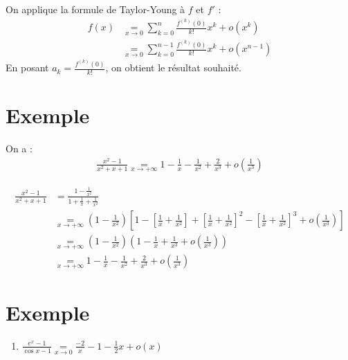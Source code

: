 \documentclass[../main.tex]{subfiles}
\begin{document}
\noindent On applique la formule de Taylor-Young à $f$ et $f'$ : 
\begin{align*}
    f(x) &\underset{x\to 0}{=} \sum_{k=0}^{n} \frac{f^{(k)}(0)}{k!} x^k + o(x^k) \\
    &\underset{x\to 0}{=} \sum_{k=0}^{n-1} \frac{f^{(k)}(0)}{k!} x^k + o(x^{n-1})
\end{align*}
En posant $a_k = \frac{f^{(k)}(0)}{k!}$, on obtient le résultat souhaité. 

\section{Exemple}
\begin{tcolorbox}[title=Exemple 25.75, title filled=false, colframe=darkgreen, colback=darkgreen!10!white]
    On a : 
    \begin{align*}
        \frac{x^2 - 1}{x^2 + x + 1} \underset{x\to +\infty}{=} 1 - \frac{1}{x} - \frac{1}{x^2} + \frac{2}{x^3} + o\left( \frac{1}{x^3} \right)
    \end{align*}
\end{tcolorbox}

\begin{align*}
    \frac{x^2 - 1}{x^2 + x + 1} &= \frac{1 - \frac{1}{x^2}}{1 + \frac{1}{x} + \frac{1}{x^2}} \\
    &\underset{x\to +\infty}{=} \left( 1 - \frac{1}{x^2} \right) \left[ 1 - \left[ \frac{1}{x} + \frac{1}{x^2} \right] + \left[ \frac{1}{x} + \frac{1}{x^2} \right]^2 - \left[ \frac{1}{x} + \frac{1}{x^2} \right]^3 + o \left( \frac{1}{x^3} \right) \right] \\
    &\underset{x\to +\infty}{=} \left( 1 - \frac{1}{x^2} \right) \left( 1 - \frac{1}{x} + \frac{1}{x^3} + o \left( \frac{1}{x^3} \right) \right) \\
    &\underset{x\to +\infty}{=} 1 - \frac{1}{x} - \frac{1}{x^2} + \frac{2}{x^3} + o \left( \frac{1}{x^3} \right)
\end{align*}

\section{Exemple}
\begin{tcolorbox}[title=Exemple 25.78, title filled=false, colframe=darkgreen, colback=darkgreen!10!white]
    \begin{enumerate}
        \item $\frac{e^x - 1}{\cos x - 1} \underset{x\to 0}{=} \frac{-2}{x} - 1 - \frac{1}{2}x + o(x)$
    \end{enumerate}
\end{tcolorbox}
\end{document}
